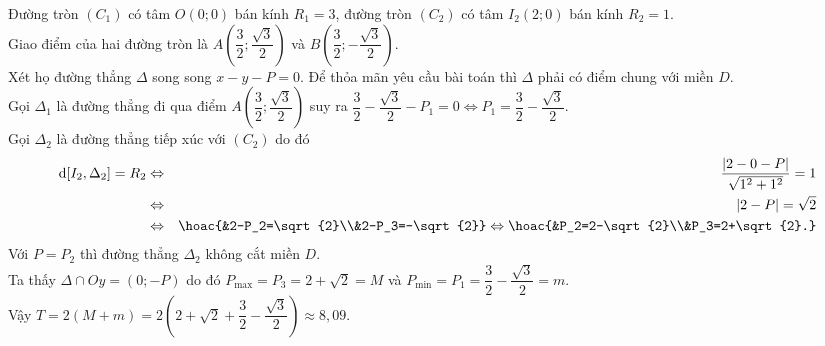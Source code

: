 \begin{ex}
{		Đường tròn $ (C_1) $ có tâm $ O(0;0) $ bán kính $ R_1=3 $, đường tròn $ (C_2) $ có tâm $ I_2(2;0) $ bán kính $ R_2=1 $.\\
		Giao điểm của hai đường tròn là $ A\left(\dfrac{3}{2};\dfrac{\sqrt{3}}{2} \right)  $ và $ B\left(\dfrac{3}{2};-\dfrac{\sqrt{3}}{2} \right) $.\\
		Xét họ đường thẳng $ \Delta $ song song $ x-y-P=0 $. Để thỏa mãn yêu cầu bài toán thì $ \Delta $ phải có điểm chung với miền $ D $.\\
		Gọi $ \Delta_1 $ là đường thẳng đi qua điểm $ A\left(\dfrac{3}{2};\dfrac{\sqrt{3}}{2} \right)  $ suy ra $ \dfrac{3}{2}-\dfrac{\sqrt{3}}{2}-P_1=0 \Leftrightarrow P_1=\dfrac{3}{2}-\dfrac{\sqrt{3}}{2}$.\\
		Gọi $ \Delta_2 $ là đường thẳng tiếp xúc với $ (C_2) $ do đó
		\begin{eqnarray*}
			\mathrm{d}[I_2,\Delta_2]=R_2	& \Leftrightarrow& \dfrac{|2-0-P|}{\sqrt{1^2+1^2}}=1\\
			&\Leftrightarrow & |2-P|=\sqrt{2}\\
			&\Leftrightarrow & \hoac{&2-P_2=\sqrt{2}\\&2-P_3=-\sqrt{2}}\Leftrightarrow \hoac{&P_2=2-\sqrt{2}\\&P_3=2+\sqrt{2}.}
		\end{eqnarray*}
		Với $ P=P_2 $ thì đường thẳng $ \Delta_2 $ không cắt miền $ D $.\\
		Ta thấy $ \Delta \cap Oy=(0;-P) $ do đó $ P_{\max}=P_3 =2+\sqrt{2}=M $ và $ P_{\min}=P_1=\dfrac{3}{2}-\dfrac{\sqrt{3}}{2}=m $.\\
		Vậy $ T=2(M+m)=2\left( 2+\sqrt{2}+\dfrac{3}{2}-\dfrac{\sqrt{3}}{2}\right)\approx 8{,}09  $.
	}
\end{ex}
